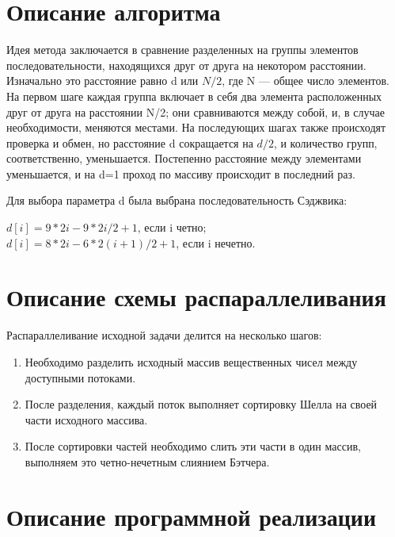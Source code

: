 \documentclass{report}
\begin{document}
\section*{Описание алгоритма}
\par Идея метода заключается в сравнение разделенных на группы элементов последовательности, находящихся друг от друга на некотором расстоянии. Изначально это расстояние равно d или $N/2$, где N — общее число элементов. На первом шаге каждая группа включает в себя два элемента расположенных друг от друга на расстоянии N/2; они сравниваются между собой, и, в случае необходимости, меняются местами. На последующих шагах также происходят проверка и обмен, но расстояние d сокращается на $d/2$, и количество групп, соответственно, уменьшается. Постепенно расстояние между элементами уменьшается, и на d=1 проход по массиву происходит в последний раз.

\par Для выбора параметра d была выбрана последовательность Сэджвика:
\begin{center}
$d[i] = 9*2i - 9*2i/2 + 1$, если i четно; \\
$d[i] = 8*2i - 6*2(i+1)/2 + 1$, если i нечетно.
\end{center}

\newpage

\section*{Описание схемы распараллеливания}
Распараллеливание исходной задачи делится на несколько шагов:
\begin{enumerate}
\item Необходимо разделить исходный массив вещественных чисел между доступными потоками. 
\item После разделения, каждый поток выполняет сортировку Шелла на своей части исходного массива.
\item После сортировки частей необходимо слить эти части в один массив, выполняем это четно-нечетным слиянием Бэтчера.
\end{enumerate}
\newpage

\section*{Описание программной реализации}
\end{document}

